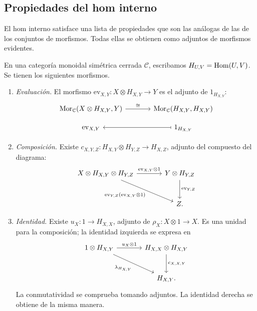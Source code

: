 \subsection{Propiedades del hom interno}

El hom interno satisface una lista de propiedades que son las análogas de las de los conjuntos de morfismos. Todas ellas se obtienen como adjuntos de morfismos evidentes.

\begin{prop}\label{prop:hom-propiedades}
En una categoría monoidal simétrica cerrada $\mathcal C$, escribamos
$H_{U,V}=\operatorname{Hom}(U,V)$. Se tienen los siguientes morfismos.
\begin{enumerate}[label=\textup{(\roman*)}]
\item \emph{Evaluación.} El morfismo
$\mathrm{ev}_{X,Y}\colon X\otimes H_{X,Y}\to Y$
es el adjunto de $1_{H_{X,Y}}$:
\[
\begin{tikzcd}[column sep=large,row sep=1em]
\hom_{\mathcal C}(X\otimes H_{X,Y},Y)
 \arrow[r,"{\cong}"]
 &\hom_{\mathcal C}(H_{X,Y},H_{X,Y})\\
\mathrm{ev}_{X,Y}
 &1_{H_{X,Y}}\arrow[l,mapsto]
\end{tikzcd}
\]
\item \emph{Composición.} Existe
$c_{X,Y,Z}\colon H_{X,Y}\otimes H_{Y,Z}\to H_{X,Z}$,
adjunto del compuesto del diagrama:
\[
\begin{tikzcd}[column sep=large,row sep=large]
X\otimes H_{X,Y}\otimes H_{Y,Z}
 \arrow[r,"{\mathrm{ev}_{X,Y}\otimes1}"]
 \arrow[dr,"{\mathrm{ev}_{Y,Z}(\mathrm{ev}_{X,Y}\otimes1)}"']
 &Y\otimes H_{Y,Z}\arrow[d,"{\mathrm{ev}_{Y,Z}}"]\\
 &Z .
\end{tikzcd}
\]
\item \emph{Identidad.} Existe
$u_X\colon1\to H_{X,X}$, adjunto de
$\rho_X\colon X\otimes1\to X$. Es una unidad para la composición; la identidad izquierda se expresa en
\[
\begin{tikzcd}[column sep=large,row sep=large]
1\otimes H_{X,Y}\arrow[r,"{u_X\otimes1}"]
 \arrow[dr,"{\lambda_{H_{X,Y}}}"']
 &H_{X,X}\otimes H_{X,Y}\arrow[d,"{c_{X,X,Y}}"]\\
 &H_{X,Y}.
\end{tikzcd}
\]
La conmutatividad se comprueba tomando adjuntos. La identidad derecha se obtiene de la misma manera.

\end{enumerate}
\end{prop}
